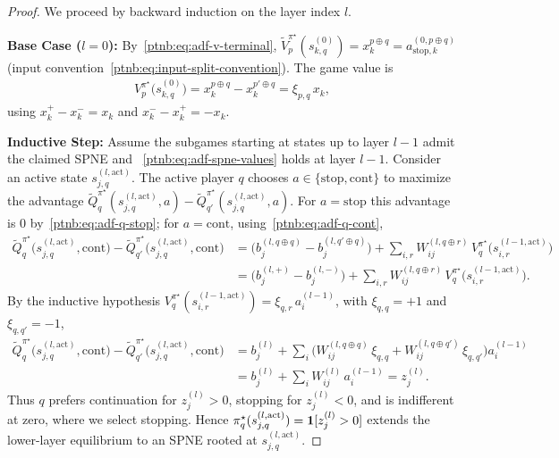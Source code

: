 \begin{proof}
We proceed by backward induction on the layer index $l$.

\textbf{Base Case ($l=0$):} By~\eqref{ptnb:eq:adf-v-terminal}, $\tilde{V}_p^{\pi^\star}(s_{k,q}^{(0)}) =
    x_k^{p \oplus q} = a_{\mathrm{stop},k}^{(0, p \oplus q)}$ (input
convention~\eqref{ptnb:eq:input-split-convention}). The game value is
\begin{align}
    V_p^{\pi^\star}\bigl(s_{k,q}^{(0)}\bigr)
    = x_k^{p \oplus q} - x_k^{p' \oplus q}
    = \xi_{p,q}\, x_k,
\end{align}
using $x_k^+ - x_k^- = x_k$ and $x_k^- - x_k^+ = -x_k$.

\textbf{Inductive Step:} Assume the subgames starting at states up to layer $l-1$ admit the claimed
SPNE and ~\eqref{ptnb:eq:adf-spne-values} holds at layer $l-1$. Consider an active state $s_{j,q}^{(l,
    \mathrm{act})}$. The active player $q$ chooses $a \in \{\mathrm{stop}, \mathrm{cont}\}$ to maximize
the advantage $\tilde{Q}_q^{\pi^\star}(s_{j,q}^{(l, \mathrm{act})}, a) -
    \tilde{Q}_{q'}^{\pi^\star}(s_{j,q}^{(l, \mathrm{act})}, a)$. For $a=\mathrm{stop}$ this advantage
is $0$ by~\eqref{ptnb:eq:adf-q-stop}; for $a=\mathrm{cont}$, using~\eqref{ptnb:eq:adf-q-cont},
\begin{align}
    \tilde{Q}_q^{\pi^\star}\bigl(s_{j,q}^{(l, \mathrm{act})}, \mathrm{cont}\bigr) -
    \tilde{Q}_{q'}^{\pi^\star}\bigl(s_{j,q}^{(l, \mathrm{act})}, \mathrm{cont}\bigr)
    &= \bigl(b_j^{(l, q \oplus q)} - b_j^{(l, q' \oplus q)}\bigr) + \sum_{i,r} W_{ij}^{(l, q \oplus
    r)}\, V_q^{\pi^\star}\bigl(s_{i,r}^{(l-1, \mathrm{act})}\bigr) \\
    &= \bigl(b_j^{(l,+)} - b_j^{(l,-)}\bigr) + \sum_{i,r} W_{ij}^{(l, q \oplus r)}\,
    V_q^{\pi^\star}\bigl(s_{i,r}^{(l-1, \mathrm{act})}\bigr).
\end{align}
By the inductive hypothesis $V_q^{\pi^\star}(s_{i,r}^{(l-1, \mathrm{act})}) = \xi_{q,r}\,
    a_i^{(l-1)}$, with $\xi_{q,q}=+1$ and $\xi_{q,q'}=-1$,
\begin{align}
    \tilde{Q}_q^{\pi^\star}\bigl(s_{j,q}^{(l, \mathrm{act})}, \mathrm{cont}\bigr) -
    \tilde{Q}_{q'}^{\pi^\star}\bigl(s_{j,q}^{(l, \mathrm{act})}, \mathrm{cont}\bigr)
    &= b_j^{(l)} + \sum_i \bigl( W_{ij}^{(l, q \oplus q)}\, \xi_{q,q} + W_{ij}^{(l, q \oplus q')}\,
    \xi_{q,q'} \bigr) a_i^{(l-1)} \\
    &= b_j^{(l)} + \sum_i W_{ij}^{(l)}\, a_i^{(l-1)} = z_j^{(l)}.
\end{align}
Thus $q$ prefers continuation for $z_j^{(l)}>0$, stopping for $z_j^{(l)}<0$, and is indifferent
at zero, where we select stopping. Hence $\pi_q^\star(s_{j,q}^{(l,\mathrm{act})})=\mathbf{1}[z_j^{(l)}>0]$
extends the lower-layer equilibrium to an SPNE rooted at $s_{j,q}^{(l,\mathrm{act})}$.


\end{proof}
